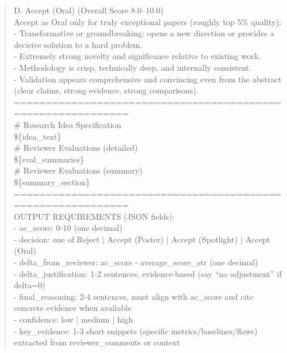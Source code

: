 \begin{quote}
\begin{tcolorbox}[breakable,colback=report!20!white, colframe=report!60!black, title=\textbf{Prompt for Report Agent (Meta-Review)}]
        D. Accept (Oral) (Overall Score 8.0–10.0)\\
        Accept as Oral only for truly exceptional papers (roughly top 5\% quality):\\
        - Transformative or groundbreaking: opens a new direction or provides a decisive solution to a hard problem.\\
        - Extremely strong novelty and significance relative to existing work.\\
        - Methodology is crisp, technically deep, and internally consistent.\\
        - Validation appears comprehensive and convincing even from the abstract (clear claims, strong evidence, strong comparisons).\\

        ============================================================\\
        \# Research Idea Specification\\
        \$\{idea\_text\}\\

        \# Reviewer Evaluations (detailed)\\
        \$\{eval\_summaries\}\\

        \# Reviewer Evaluations (summary)\\
        \$\{summary\_section\}\\
        ============================================================\\

        OUTPUT REQUIREMENTS (JSON fields):\\
        - ac\_score: 0-10 (one decimal)\\
        - decision: one of Reject $\mid$ Accept (Poster) $\mid$ Accept (Spotlight) $\mid$ Accept (Oral)\\
        - delta\_from\_reviewer: ac\_score - {average\_score\_str} (one decimal)\\
        - delta\_justification: 1-2 sentences, evidence-based (say ``no adjustment'' if delta=0)\\
        - final\_reasoning: 2-4 sentences, must align with ac\_score and cite concrete evidence when available\\
        - confidence: low $\mid$ medium $\mid$ high\\
        - key\_evidence: 1-3 short snippets (specific metrics/baselines/flaws) extracted from reviewer\_comments or context
    \end{tcolorbox}


\end{quote}
